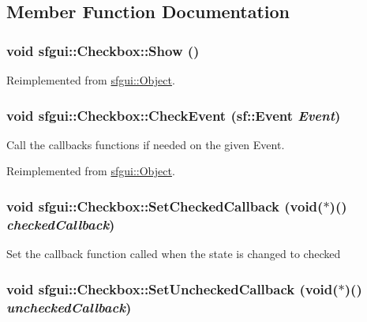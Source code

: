 \subsection{Member Function Documentation}
\hypertarget{classsfgui_1_1Checkbox_0028c58d4579845c1bdf3cae7ec9af5a}{
\subsubsection[Show]{\setlength{\rightskip}{0pt plus 5cm}void sfgui::Checkbox::Show ()}}
\label{classsfgui_1_1Checkbox_0028c58d4579845c1bdf3cae7ec9af5a}




Reimplemented from \hyperlink{classsfgui_1_1Object_cdf7f9b5f731e49e0e13e55de704805d}{sfgui::Object}.\hypertarget{classsfgui_1_1Checkbox_d618a9010bef60b8ea2f11f893320fb8}{
\subsubsection[CheckEvent]{\setlength{\rightskip}{0pt plus 5cm}void sfgui::Checkbox::CheckEvent (sf::Event {\em Event})}}
\label{classsfgui_1_1Checkbox_d618a9010bef60b8ea2f11f893320fb8}




Call the callbacks functions if needed on the given Event. 

Reimplemented from \hyperlink{classsfgui_1_1Object_cd9dbf2abe79e04c22f281bccb8bdb0e}{sfgui::Object}.\hypertarget{classsfgui_1_1Checkbox_87db2a071f8c0bb8dd8124a2ff22940b}{
\subsubsection[SetCheckedCallback]{\setlength{\rightskip}{0pt plus 5cm}void sfgui::Checkbox::SetCheckedCallback (void($\ast$)() {\em checkedCallback})}}
\label{classsfgui_1_1Checkbox_87db2a071f8c0bb8dd8124a2ff22940b}




Set the callback function called when the state is changed to checked \hypertarget{classsfgui_1_1Checkbox_327bd2236295963fa29cc482d89bba33}{
\subsubsection[SetUncheckedCallback]{\setlength{\rightskip}{0pt plus 5cm}void sfgui::Checkbox::SetUncheckedCallback (void($\ast$)() {\em uncheckedCallback})}}
\label{classsfgui_1_1Checkbox_327bd2236295963fa29cc482d89bba33}




